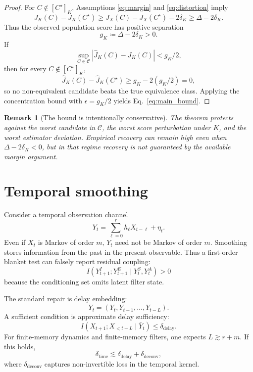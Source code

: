 \documentclass[10pt]{article}
\newtheorem{remark}{Remark}
\newcommand{\MI}{I}
\newcommand{\cC}{\mathcal{C}}
\begin{document}
\begin{proof}
For \(C\notin[C^\star]_K\), Assumptions \ref{eq:margin} and \ref{eq:distortion} imply
\[
J_K(C)-J_K(C^\star)
\ge
J_X(C)-J_X(C^\star)-2\delta_K
\ge
\Delta-2\delta_K.
\]
Thus the observed population score has positive separation
\[
g_K\coloneqq \Delta-2\delta_K>0.
\]
If
\[
\sup_{C\in\cC}|\hat J_K(C)-J_K(C)|<g_K/2,
\]
then for every \(C\notin[C^\star]_K\),
\[
\hat J_K(C)-\hat J_K(C^\star)
\ge
g_K-2(g_K/2)=0,
\]
so no non-equivalent candidate beats the true equivalence class. Applying the concentration bound with \(\epsilon=g_K/2\) yields Eq.~\eqref{eq:main_bound}.
\end{proof}

\begin{remark}[The bound is intentionally conservative]
The theorem protects against the worst candidate in \(\cC\), the worst score perturbation under \(K\), and the worst estimator deviation. Empirical recovery can remain high even when \(\Delta-2\delta_K<0\), but in that regime recovery is not guaranteed by the available margin argument.
\end{remark}

\section{Temporal smoothing}

Consider a temporal observation channel
\begin{equation}
Y_t=\sum_{\ell=0}^r h_\ell X_{t-\ell}+\eta_t.
\label{eq:temporal_smoothing}
\end{equation}
Even if \(X_t\) is Markov of order \(m\), \(Y_t\) need not be Markov of order \(m\). Smoothing stores information from the past in the present observable. Thus a first-order blanket test can falsely report residual coupling:
\[
\MI(Y^{I}_{t+1};Y^{E}_{t+1}\mid Y^{S}_t,Y^{A}_t)>0
\]
because the conditioning set omits latent filter state.

The standard repair is delay embedding:
\[
\bar Y_t=(Y_t,Y_{t-1},\ldots,Y_{t-L}).
\]
A sufficient condition is approximate delay sufficiency:
\begin{equation}
\MI(X_{t+1};X_{<t-L}\mid \bar Y_t)\le \delta_{\mathrm{delay}}.
\label{eq:delay_suff}
\end{equation}
For finite-memory dynamics and finite-memory filters, one expects \(L\gtrsim r+m\). If this holds,
\[
\delta_{\mathrm{time}}\lesssim \delta_{\mathrm{delay}}+\delta_{\mathrm{deconv}},
\]
where \(\delta_{\mathrm{deconv}}\) captures non-invertible loss in the temporal kernel.
\end{document}
